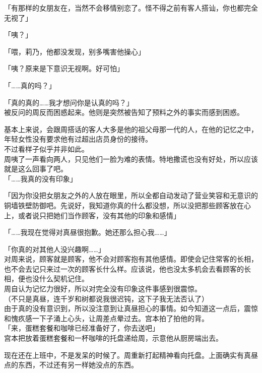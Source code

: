 「有那样的女朋友在，当然不会移情别恋了。怪不得之前有客人搭讪，你也都完全无视了」

「咦？」

「喂，莉乃，他都没发现，别多嘴害他操心」

「咦？原来是下意识无视啊。好可怕」

「……真的吗？」

「真的真的……我才想问你是认真的吗？」\\

被反问的周反而困惑起来。他则是突然被告知了预料之外的事实而感到困惑。

基本上来说，会跟周搭话的客人大多是他的祖父母那一代的人，在他的记忆之中，年轻女性没有要求他有过超出店员身份的接待。\\

不过看样子似乎并非如此。\\

周咦了一声看向两人，只见他们一脸为难的表情。特地撒谎也没有好处，所以应该就是这么回事了吧。\\

「……我真的没有印象」

「因为你没把女朋友之外的人放在眼里，所以全都自动发动了营业笑容和无意识的铜墙铁壁防御吧。先说好，我知道你真的什么都没想，所以没把那些顾客放在心上，或者说只把她们当作顾客，没有其他的印象和感情」

「……我现在觉得对真昼很抱歉。她还那么担心我……」

「你真的对其他人没兴趣啊……」\\

对周来说，顾客就是顾客，他不会对顾客抱有其他感情。即使会记住常客的长相，也不会去记只来过一次的顾客长什么样。应该说，他也没太多机会去看顾客的长相，便也没什么契机记住。\\

周自认为记忆力很好，所以对完全没有印象这件事感到很震惊。\\

（不只是真昼，连千岁和树都说我很迟钝，这下子我无法否认了）\\

由于真的没有意识到，所以没注意到让真昼担心的事情。如今知道这一点后，震惊和愧疚感一下子涌上心头，让周差点晕过去。宫本拍了拍他的背。\\

「来，蛋糕套餐和咖啡已经准备好了，你去送吧」\\

宫本把放着蛋糕套餐和一杯咖啡的托盘递给周，示意他从厨房端出去。

现在还在上班中，不是发呆的时候了。周重新打起精神看向托盘。上面确实有真昼点的东西，不过还有另一样她没点的东西。\\

